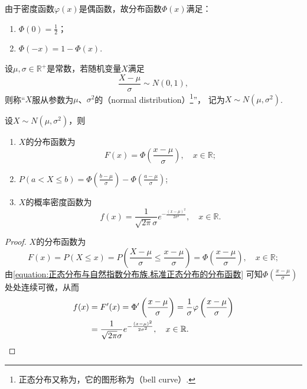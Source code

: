 \begin{property}
由于密度函数\(\varphi(x)\)是偶函数，故分布函数\(\Phi(x)\)满足：
\begin{enumerate}
\item \(\Phi(0) = \frac{1}{2}\)；
\item \(\Phi(-x) = 1 - \Phi(x)\).
\end{enumerate}
\end{property}

\begin{definition}
设\(\mu,\sigma\in\mathbb{R}^+\)是常数，若随机变量\(X\)满足\[
\frac{X-\mu}{\sigma} \sim N(0,1),
\]
则称“\(X\)服从参数为\(\mu\)、\(\sigma^2\)的（normal distribution）\footnote{%
正态分布又称为，它的图形称为（bell curve）.
}”，%
记为\(X \sim N(\mu,\sigma^2)\).
\end{definition}

\begin{theorem}
设\(X \sim N(\mu,\sigma^2)\)，则
\begin{enumerate}
\item \(X\)的分布函数为\[
F(x) = \Phi\left(\frac{x-\mu}{\sigma}\right),
\quad x\in\mathbb{R};
\]
\item \(P(a < X \leqslant b) = \Phi\left(\frac{b-\mu}{\sigma}\right) - \Phi\left(\frac{a-\mu}{\sigma}\right)\);
\item \(X\)的概率密度函数为\[
f(x) = \frac{1}{\sqrt{2 \pi} \sigma} e^{-\frac{(x-\mu)^2}{2\sigma^2}},
\quad x\in\mathbb{R}.
\]
\end{enumerate}
\begin{proof}
\(X\)的分布函数为\[
F(x) = P(X \leqslant x)
= P\left(\frac{X-\mu}{\sigma}\leqslant\frac{x-\mu}{\sigma}\right)
= \Phi\left(\frac{x-\mu}{\sigma}\right), \quad x\in\mathbb{R};
\]由\cref{equation:正态分布与自然指数分布族.标准正态分布的分布函数} 可知\(\Phi\left(\frac{x-\mu}{\sigma}\right)\)处处连续可微，从而\begin{align*}
f(x) &= F'(x) = \Phi'\left(\frac{x-\mu}{\sigma}\right)
= \frac{1}{\sigma} \varphi\left(\frac{x-\mu}{\sigma}\right) \\
&= \frac{1}{\sqrt{2 \pi} \sigma} e^{-\frac{(x-\mu)^2}{2\sigma^2}},
\quad x\in\mathbb{R}.
\qedhere
\end{align*}
\end{proof}
\end{theorem}


